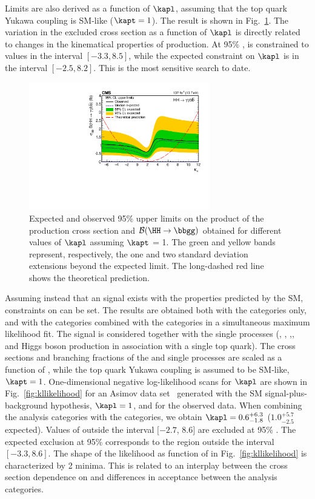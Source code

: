 \documentclass[11pt,a4paper,cmspaper,final,collab]{cms-tdr}
\begin{document}
Limits are also derived as a function of $\kapl$, assuming that the top quark Yukawa coupling is SM-like ($\kapt = 1$). The result is shown in Fig.~\ref{fig:klambdascan}. The variation in the excluded cross section as a function of $\kapl$ is directly related to changes in the kinematical properties of \HH production. At 95\% \CL, \kapl is constrained to values in the interval $[-3.3, 8.5]$, while the expected constraint on $\kapl$ is in the interval $[-2.5, 8.2]$. This is the most sensitive search to date.

\begin{figure}[!ht]
  \centering
\includegraphics[width=0.7\textwidth]{Figure_010.pdf}\hfil 

  \caption{Expected and observed 95\% \CL upper limits on the product of the \HH production cross section and $\mathcal{B}(\HH\to\bbgg)$ obtained for different values of $\kapl$ assuming $\kapt$ = 1. The green and yellow bands represent, respectively, the one and two standard deviation extensions beyond the expected limit. The long-dashed red line shows the theoretical prediction.
}
  \label{fig:klambdascan}
\end{figure}


Assuming instead that an \HH signal exists with the properties predicted by the SM, constraints on \lbdHHH can be set. The results are obtained both with the \HH categories only, and with the \HH categories combined with the \ttH categories in a simultaneous maximum likelihood fit. 
The \HH signal is considered together with the single \PH processes (\ttH, \ggH, \VBFH,\VH, and Higgs boson production in association with a single top
quark). The cross sections and branching fractions of the \HH and single \PH processes are scaled as a function of \kapl, while the top quark Yukawa coupling is assumed to be SM-like, $\kapt=1$.
One-dimensional negative log-likelihood scans for $\kapl$ are shown in Fig.~\ref{fig:kllikelihood} for an Asimov data set~\cite{CLSA} generated with the SM signal-plus-background hypothesis, $\kapl=1$, and for the observed data.
When combining the \HH analysis categories with the \ttH categories, we obtain $\kapl = 0.6^{+6.3}_{-1.8}$ ($1.0^{+5.7}_{-2.5}$ expected).
Values of \kapl outside the interval $[-2.7$, $8.6]$ are excluded at 95\% \CL. The expected exclusion at 95\% \CL corresponds to the region outside the interval $[-3.3,8.6]$. The shape of the likelihood as function of \kapl in Fig.~\ref{fig:kllikelihood} is characterized by 2 minima. This is related to an interplay between the cross section dependence on \kapl and differences in acceptance between the analysis categories.
\end{document}
